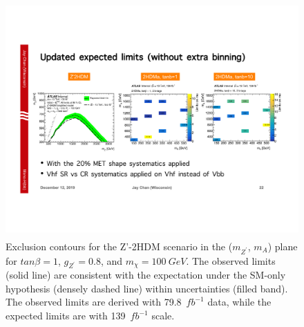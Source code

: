 \begin{figure}[!htb]
    \centering
    \includegraphics[width=12cm, height=9cm, trim={2.5cm 7.5cm 17.6cm 8cm}, clip]{chapters/c9/figures/ZPrime2HDMLimit-139Exp.pdf}
    \caption{Exclusion contours for the Z'-2HDM scenario in the ($m_{Z^{\prime}}$, $m_{A}$) plane for $tan\beta= 1$, $g_{Z^{\prime}}=0.8$, and $m_{\chi}=100~GeV$. 
    The observed limits (solid line) are consistent with the expectation under the SM-only hypothesis (densely dashed line) within uncertainties (filled band). 
    The observed limits are derived with 79.8~$fb^{-1}$ data, while the expected limits are with 139~$fb^{-1}$ scale.}
    \label{fig:zprime-2hdm-limit-139}
\end{figure}
